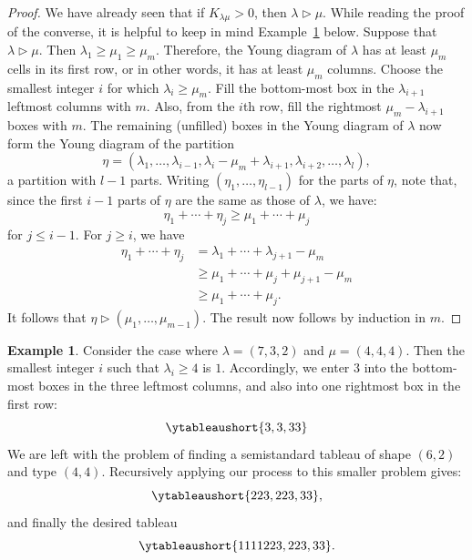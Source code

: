 \documentclass[11pt]{amsart}
\theoremstyle{definition}
\theoremstyle{example}
\newtheorem{example}[theorem]{Example}
\begin{document}
\begin{proof}
  We have already seen that if $K_{\lambda\mu}>0$, then $\lambda \rhd \mu$.
  While reading the proof of the converse, it is helpful to keep in mind Example~\ref{example:can-tab} below.
  Suppose that $\lambda\rhd\mu$.
  Then $\lambda_1\geq \mu_1\geq \mu_m$.
  Therefore, the Young diagram of $\lambda$ has at least $\mu_m$ cells in its first row, or in other words, it has at least $\mu_m$ columns.
  Choose the smallest integer $i$ for which $\lambda_i\geq\mu_m$.
  Fill the bottom-most box in the $\lambda_{i+1}$ leftmost columns with $m$.
  Also, from the $i$th row, fill the rightmost $\mu_m-\lambda_{i+1}$ boxes with $m$.
  The remaining (unfilled) boxes in the Young diagram of $\lambda$ now form the Young diagram of the partition
  \begin{displaymath}
  \eta=(\lambda_1,\dotsc,\lambda_{i-1}, \lambda_i - \mu_m + \lambda_{i+1}, \lambda_{i+2},\dotsc,\lambda_l), 
  \end{displaymath}
  a partition with $l-1$ parts.
  Writing $(\eta_1,\dotsc,\eta_{l-1})$ for the parts of $\eta$, note that, since the first $i-1$ parts of $\eta$ are the same as those of $\lambda$,
  we have:
  \begin{displaymath}
    \eta_1+\dotsb + \eta_j\geq \mu_1 + \dotsb + \mu_j
  \end{displaymath}
  for $j\leq i-1$.
  For $j\geq i$, we have
  \begin{align*}
    \eta_1 + \dotsb + \eta_j & = \lambda_1 + \dotsb + \lambda_{j+1} -\mu_m\\
                             & \geq \mu_1 + \dotsb + \mu_j + \mu_{j+1} - \mu_m\\
                             & \geq \mu_1 + \dotsb + \mu_j.
  \end{align*}
  It follows that $\eta\rhd (\mu_1,\dotsc,\mu_{m-1})$.
  The result now follows by induction in $m$.
\end{proof}
\begin{example}
  \label{example:can-tab}
  Consider the case where $\lambda=(7,3,2)$ and $\mu=(4,4,4)$.
  Then the smallest integer $i$ such that $\lambda_i\geq 4$ is $1$.
  Accordingly, we enter $3$ into the bottom-most boxes in the three leftmost columns, and also into one rightmost box in the first row:
  \begin{displaymath}
    \ytableaushort{{}{}{}{}{}{}3,{}{}3,33}
  \end{displaymath}
  We are left with the problem of finding a semistandard tableau of shape $(6,2)$ and type $(4,4)$.
  Recursively applying our process to this smaller problem gives:
  \begin{displaymath}
    \ytableaushort{{}{}{}{}223,223,33},
  \end{displaymath}
  and finally the desired tableau
  \begin{displaymath}
    \ytableaushort{1111223,223,33}.
  \end{displaymath}
\end{example}
\end{document}
